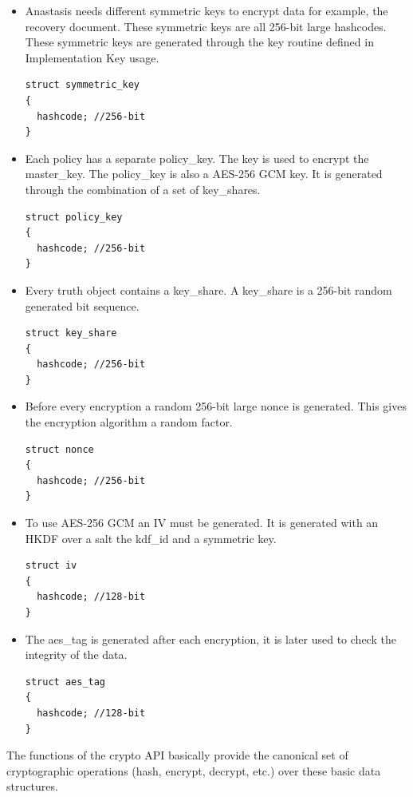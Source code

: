 \begin{itemize}
\item
Anastasis needs different symmetric keys to encrypt data for example, the recovery document. These symmetric keys are all 256-bit large hashcodes. These symmetric keys are generated through the key routine defined in Implementation Key usage.
\begin{lstlisting}
struct symmetric_key
{
  hashcode; //256-bit
}
\end{lstlisting}

\item
Each policy has a separate policy\_key. The key is used to encrypt the master\_key.
The policy\_key is also a AES-256 GCM key. It is generated through the combination of a set of key\_shares.
\begin{lstlisting}
struct policy_key
{
  hashcode; //256-bit
}
\end{lstlisting}

\item
Every truth object contains a key\_share. A key\_share is a 256-bit random generated bit sequence.
\begin{lstlisting}
struct key_share
{
  hashcode; //256-bit
}
\end{lstlisting}

\item
Before every encryption a random 256-bit large nonce is generated. This gives the encryption algorithm a random factor.
\begin{lstlisting}
struct nonce
{
  hashcode; //256-bit
}
\end{lstlisting}

\item
To use AES-256 GCM an IV must be generated. It is generated with an HKDF over a salt the kdf\_id and a symmetric key.
\begin{lstlisting}
struct iv
{
  hashcode; //128-bit
}
\end{lstlisting}

\item
The aes\_tag is generated after each encryption, it is later used to check the integrity of the data.
\begin{lstlisting}
struct aes_tag
{
  hashcode; //128-bit
}
\end{lstlisting}
\end{itemize}

The functions of the crypto API basically provide the canonical set of
cryptographic operations (hash, encrypt, decrypt, etc.)  over these
basic data structures.


